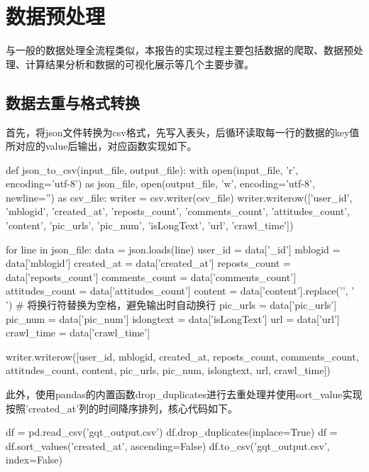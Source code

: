 \section{数据预处理}
与一般的数据处理全流程类似，本报告的实现过程主要包括数据的爬取、数据预处理、计算结果分析和数据的可视化展示等几个主要步骤。
\\

\subsection{数据去重与格式转换}
首先，将json文件转换为csv格式，先写入表头，后循环读取每一行的数据的key值所对应的value后输出，对应函数实现如下。
\begin{python}
def json_to_csv(input_file, output_file):
    with open(input_file, 'r', encoding='utf-8') as json_file, open(output_file, 'w', encoding='utf-8',
                                                                    newline='') as csv_file:
        writer = csv.writer(csv_file)
        writer.writerow(['user_id', 'mblogid', 'created_at', 'reposts_count', 'comments_count', 'attitudes_count',
                         'content', 'pic_urls', 'pic_num', 'isLongText', 'url', 'crawl_time'])

        for line in json_file:
            data = json.loads(line)
            user_id = data['_id']
            mblogid = data['mblogid']
            created_at = data['created_at']
            reposts_count = data['reposts_count']
            comments_count = data['comments_count']
            attitudes_count = data['attitudes_count']
            content = data['content'].replace('\n', ' ')  # 将换行符替换为空格，避免输出时自动换行
            pic_urls = data['pic_urls']
            pic_num = data['pic_num']
            islongtext = data['isLongText']
            url = data['url']
            crawl_time = data['crawl_time']

            writer.writerow([user_id, mblogid, created_at, reposts_count, comments_count, attitudes_count,
                             content, pic_urls, pic_num, islongtext, url, crawl_time])
\end{python}

此外，使用pandas的内置函数drop\_duplicates进行去重处理并使用sort\_value实现按照'created\_at'列的时间降序排列，核心代码如下。

\begin{python}
df = pd.read_csv('gqt_output.csv')
df.drop_duplicates(inplace=True)
df = df.sort_values('created_at', ascending=False)
df.to_csv('gqt_output.csv', index=False)
\end{python}

